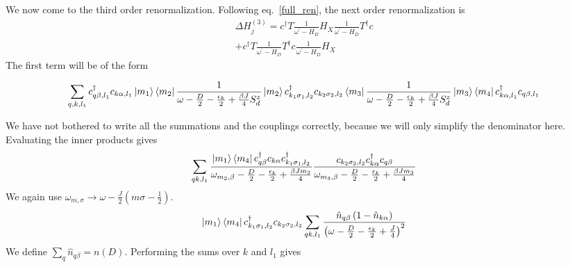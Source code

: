 \documentclass[reprint,prb,superscriptaddress]{revtex4-2}
\begin{document}
We now come to the third order renormalization.
Following eq.~\ref{full_ren}, the next order renormalization is
\begin{equation}\begin{aligned}
	\label{psector_3rd_ren}
	\Delta H^{(3)}_j = c^\dagger T \frac{1}{\omega^\prime - H_D} H_X \frac{1}{\omega^\prime - H_D} T^\dagger c \\
	+ c^\dagger T \frac{1}{\omega^\prime - H_D} T^\dagger c \frac{1}{\omega^\prime - H_D} H_X
\end{aligned}\end{equation}
The first term will be of the form
\begin{widetext}
\begin{equation}\begin{aligned}
	\sum_{q,k,l_1} c^\dagger_{q\beta, l_1}c_{k \alpha, l_1}\ket{m_1}\bra{m_2} \frac{1}{\omega - \frac{D}{2} - \frac{\epsilon_k}{2} + \frac{\beta J}{4}S_d^z} \ket{m_2} c^\dagger_{k_1 \sigma_1, l_2}c_{k_2 \sigma_2,l_2} \bra{m_3}\frac{1}{\omega - \frac{D}{2} - \frac{\epsilon_k}{2} + \frac{\beta J}{4}S_d^z}\ket{m_3}\bra{m_4}c^\dagger_{k\alpha, l_1}c_{q\beta, l_1}
\end{aligned}\end{equation}
\end{widetext}
We have not bothered to write all the summations and the couplings correctly, because we will only simplify the denominator here. Evaluating the inner products gives
\begin{equation}\begin{aligned}
	\sum_{qk,l_1} \frac{\ket{m_1}\bra{m_4}c^\dagger_{q\beta}c_{k \alpha}c^\dagger_{k_1 \sigma_1, l_2}}{\omega_{m_2,\beta} - \frac{D}{2} - \frac{\epsilon_k}{2} + \frac{\beta J m_2}{4}}  \frac{c_{k_2 \sigma_2,l_2}c^\dagger_{k\alpha}c_{q\beta}}{\omega_{m_3,\beta} - \frac{D}{2} - \frac{\epsilon_k}{2} + \frac{\beta J m_3}{4}}
\end{aligned}\end{equation}
We again use \(\omega_{m,\sigma} \to \omega - \frac{J}{2}\left(m\sigma - \frac{1}{2}\right)\).
\begin{equation}\begin{aligned}
	\ket{m_1}\bra{m_4}c^\dagger_{k_1 \sigma_1, l_2}c_{k_2 \sigma_2,l_2}\sum_{qk,l_1} \frac{\hat n_{q\beta}\left(1 - \hat n_{k\alpha}\right)}{\left(\omega - \frac{D}{2} - \frac{\epsilon_k}{2} + \frac{J}{4}\right)^2}
\end{aligned}\end{equation}
We define \(\sum_q \hat n_{q\beta} = n(D)\). Performing the sums over \(k\) and \(l_1\) gives
\end{document}
